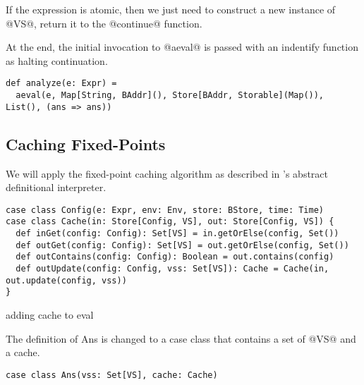 \documentclass[acmsmall,review,anonymous]{acmart}\settopmatter{printfolios=true,printccs=false,printacmref=false}
\begin{document}
If the expression is atomic, then we just need to construct a new instance of
@VS@, return it to the @continue@ function.

At the end, the initial invocation to @aeval@ is passed with an indentify
function as halting continuation.
\begin{lstlisting}
def analyze(e: Expr) =
  aeval(e, Map[String, BAddr](), Store[BAddr, Storable](Map()), List(), (ans => ans))
\end{lstlisting}

\subsection{Caching Fixed-Points}

We will apply the fixed-point caching algorithm as described in
\citeauthor{darais2017abstracting}'s abstract definitional interpreter.

\begin{lstlisting}
case class Config(e: Expr, env: Env, store: BStore, time: Time)
case class Cache(in: Store[Config, VS], out: Store[Config, VS]) {
  def inGet(config: Config): Set[VS] = in.getOrElse(config, Set())
  def outGet(config: Config): Set[VS] = out.getOrElse(config, Set())
  def outContains(config: Config): Boolean = out.contains(config)
  def outUpdate(config: Config, vss: Set[VS]): Cache = Cache(in, out.update(config, vss))
}
\end{lstlisting}

adding cache to eval

The definition of Ans is changed to a case class that contains a set of @VS@ and
a cache.
\begin{lstlisting}
case class Ans(vss: Set[VS], cache: Cache)
\end{lstlisting}
\end{document}
